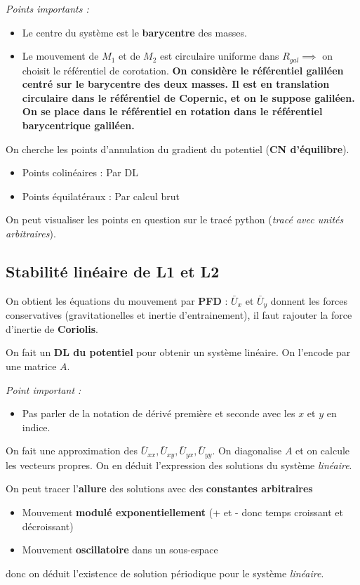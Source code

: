 \documentclass[12pt]{article}
\begin{document}
	\textit{Points importants :}
	\begin{itemize}
		\item Le centre du système est le \textbf{barycentre} des masses.
		\item Le mouvement de $M_1$ et de $M_2$ est circulaire uniforme dans $R_{gal} \implies$ on choisit le référentiel de corotation. \textbf{On considère le référentiel galiléen centré sur le barycentre des deux masses. Il est en translation circulaire dans le référentiel de Copernic, et on le suppose galiléen. On se place dans le référentiel en rotation dans le référentiel barycentrique galiléen.}
	\end{itemize}
	
	\bigskip
	
	On cherche les points d'annulation du gradient du potentiel (\textbf{CN d'équilibre}). 
	\begin{itemize}
		\item Points colinéaires : Par DL
		\item Points équilatéraux : Par calcul brut
	\end{itemize}
	
	On peut visualiser les points en question sur le tracé python (\textit{tracé avec unités arbitraires}).
	
	
	\subsection{Stabilité linéaire de L1 et L2}
	On obtient les équations du mouvement par \textbf{PFD} : $\bar{U}_x$ et $\bar{U}_y$ donnent les forces conservatives (gravitationelles et inertie d'entrainement), il faut rajouter la force d'inertie de \textbf{Coriolis}.
	
	On fait un \textbf{DL du potentiel} pour obtenir un système linéaire. On l'encode par une matrice $A$.
	
	\textit{Point important :}
	\begin{itemize}
		\item Pas parler de la notation de dérivé première et seconde avec les $x$ et $y$ en indice.
	\end{itemize}
	
	\bigskip
	
	On fait une approximation des $\bar{U}_{xx}, \bar{U}_{xy}, \bar{U}_{yx}, \bar{U}_{yy}$. On diagonalise $A$ et on calcule les vecteurs propres. On en déduit l'expression des solutions du système \textit{linéaire}.
	
	On peut tracer l'\textbf{allure} des solutions avec des \textbf{constantes arbitraires}
	\begin{itemize}
		\item Mouvement \textbf{modulé exponentiellement} (+ et - donc temps croissant et décroissant)
		\item Mouvement \textbf{oscillatoire} dans un sous-espace
	\end{itemize}
	donc on déduit l'existence de solution périodique pour le système \textit{linéaire}.
	
\end{document}
